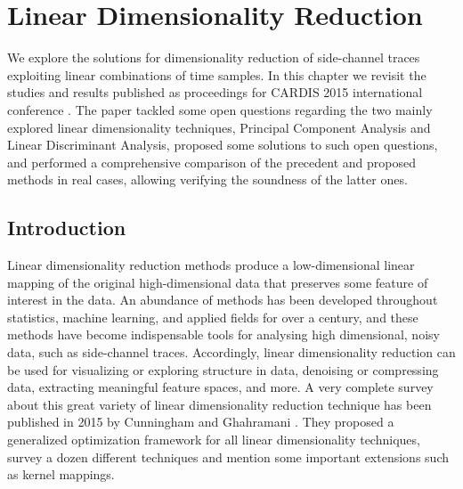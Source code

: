 
\chapter{Linear Dimensionality Reduction} 
\label{ChapterLinear}

We explore the solutions for dimensionality reduction of side-channel traces exploiting linear combinations of time samples. In this chapter we revisit the studies and results published as proceedings for CARDIS 2015 international conference \cite{Cagli2016}. The paper tackled some open questions regarding the two mainly explored linear dimensionality techniques, \ie Principal Component Analysis and Linear Discriminant Analysis, proposed some solutions to such open questions, and performed a comprehensive comparison of the precedent and proposed methods in real cases, allowing verifying the soundness of the latter ones.

\section{Introduction}
Linear dimensionality reduction methods produce a low-dimensional linear mapping of the original high-dimensional data that preserves some feature of interest in the data. An abundance of methods has been developed throughout statistics, machine learning, and applied fields for over a century, and these methods have become indispensable tools for analysing high dimensional, noisy data, such as side-channel traces.  Accordingly, linear dimensionality reduction can be used for visualizing or exploring structure in data, denoising or compressing data, extracting meaningful feature spaces, and more. A very complete survey about this great variety of linear dimensionality reduction technique has been published in 2015 by Cunningham and Ghahramani \cite{cunningham2015linear}. They proposed a generalized optimization framework for all linear dimensionality techniques, survey a dozen different techniques and mention some important extensions such as kernel mappings. \\


